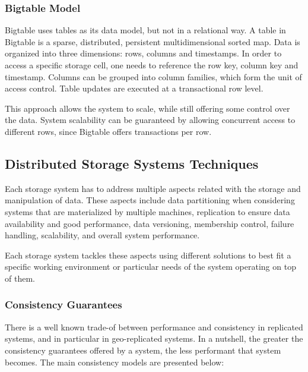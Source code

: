 \subsubsection{Bigtable Model}
\label{sec:bigtable_model}
Bigtable\cite{bigtable} uses tables as its data model, but not in a relational way. A table in Bigtable is a sparse, distributed, persistent multidimensional sorted map. Data is organized into three dimensions: rows, columns and timestamps. In order to access a specific storage cell, one needs to reference the row key, column key and timestamp. Columns can be grouped into column families, which form the unit of access control. Table updates are executed at a transactional row level.\par
	This approach allows the system to scale, while still offering some control over the data. System scalability can be guaranteed by allowing concurrent access to different rows, since Bigtable offers transactions per row.

\subsection{Distributed Storage Systems Techniques}
\label{sec:distributed_storage_systems_techniques}
Each storage system has to address multiple aspects related with the storage and manipulation of data. These aspects include data partitioning when considering systems that are materialized by multiple machines, replication to ensure data availability and good performance, data versioning, membership control, failure handling, scalability, and overall system performance.\par
	Each storage system tackles these aspects using different solutions to best fit a specific working environment or particular needs of the system operating on top of them.

\subsubsection{Consistency Guarantees}
\label{sec:consistency_guarantees}
There is a well known trade-of between performance and consistency in replicated systems, and in particular in geo-replicated systems\cite{cap}. In a nutshell, the greater the consistency guarantees offered by a system, the less performant that system becomes. The main consistency models are presented below:

